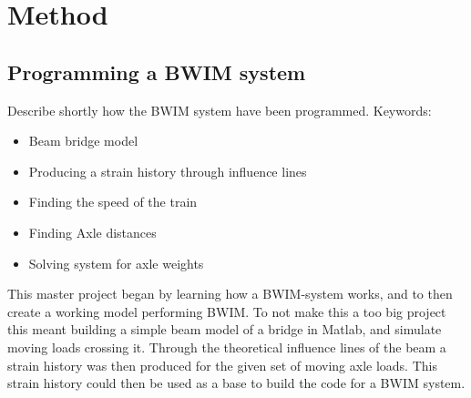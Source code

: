 \section{Method}

\subsection{Programming a BWIM system}
Describe shortly how the BWIM system have been programmed.
Keywords: 
\begin{itemize}
\item Beam bridge model
\item Producing a strain history through influence lines
\item Finding the speed of the train
\item Finding Axle distances
\item Solving system for axle weights
\end{itemize}

This master project began by learning how a BWIM-system works, and to then create a working model performing BWIM. To not make this a too big project this meant building a simple beam model of a bridge in Matlab, and simulate moving loads crossing it. Through the theoretical influence lines of the beam a strain history was then produced for the given set of moving axle loads. This strain history could then be used as a base to build the code for a BWIM system. 
\\
